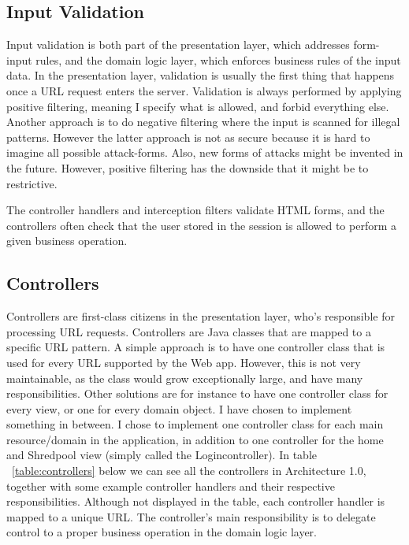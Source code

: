 \subsection{Input Validation}
Input validation is both part of the presentation layer, which addresses form-input rules, and the domain logic layer, which enforces business rules of the input data. In the presentation layer, validation is usually the first thing that happens once a URL request enters the server. Validation is always performed by applying positive filtering, meaning I specify what is allowed, and forbid everything else. Another approach is to do negative filtering where the input is scanned for illegal patterns. However the latter approach is not as secure because it is hard to imagine all possible attack-forms\cite{sqlinjection}. Also, new forms of attacks might be invented in the future. However, positive filtering has the downside that it might be to restrictive.

The controller handlers and interception filters validate HTML forms, and the controllers often check that the user stored in the session is allowed to perform a given business operation. 

\subsection{Controllers}
Controllers are first-class citizens in the presentation layer, who's responsible for processing URL requests. Controllers are Java classes that are mapped to a specific URL pattern. A simple approach is to have one controller class that is used for every URL supported by the Web app. However, this is not very maintainable, as the class would  grow exceptionally large, and have many responsibilities. Other solutions are for instance to have one controller class for every view, or one for every domain object. I have chosen to implement something in between. I chose to implement one controller class for each main resource/domain in the application, in addition to one controller for the home and Shredpool view (simply called the Logincontroller). In table ~\ref{table:controllers} below we can see all the controllers in Architecture 1.0, together with some example controller handlers and their respective responsibilities. Although not displayed in the table, each controller handler is mapped to a unique URL. The controller's main responsibility is to delegate control to a proper business operation in the domain logic layer. 


